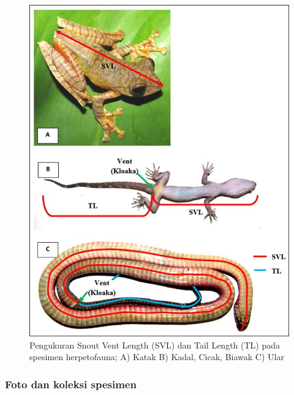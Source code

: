 \documentclass[
]{book}
\begin{document}
\begin{figure}

{\centering \includegraphics[width=1\linewidth]{images/mhf_ilustration} 

}

\caption{Pengukuran Snout Vent Length (SVL) dan Tail Length (TL) pada spesimen herpetofauna; A) Katak B) Kadal, Cicak, Biawak C) Ular}\label{fig:figmhf}
\end{figure}

\hypertarget{foto-dan-koleksi-spesimen}{%
\subsubsection*{Foto dan koleksi spesimen}\label{foto-dan-koleksi-spesimen}}
\end{document}
